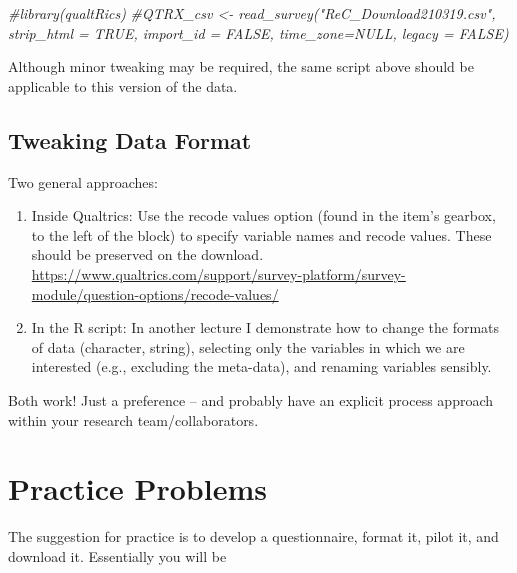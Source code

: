 \documentclass[
  english,
]{book}
\newenvironment{Shaded}{\begin{snugshade}}{\end{snugshade}}
\newcommand{\CommentTok}[1]{\textcolor[rgb]{0.56,0.35,0.01}{\textit{#1}}}
\begin{document}
\begin{Shaded}
\begin{Highlighting}[]
\CommentTok{\#library(qualtRics)}
\CommentTok{\#QTRX\_csv \textless{}{-} read\_survey("ReC\_Download210319.csv", strip\_html = TRUE, import\_id = FALSE, time\_zone=NULL, legacy = FALSE)}
\end{Highlighting}
\end{Shaded}

Although minor tweaking may be required, the same script above should be applicable to this version of the data.

\hypertarget{tweaking-data-format}{%
\subsection{Tweaking Data Format}\label{tweaking-data-format}}

Two general approaches:

\begin{enumerate}
\def\labelenumi{\arabic{enumi}.}
\item
  Inside Qualtrics: Use the recode values option (found in the item's gearbox, to the left of the block) to specify variable names and recode values. These should be preserved on the download. \url{https://www.qualtrics.com/support/survey-platform/survey-module/question-options/recode-values/}
\item
  In the R script: In another lecture I demonstrate how to change the formats of data (character, string), selecting only the variables in which we are interested (e.g., excluding the meta-data), and renaming variables sensibly.
\end{enumerate}

Both work! Just a preference -- and probably have an explicit process approach within your research team/collaborators.

\hypertarget{practice-problems-1}{%
\section{Practice Problems}\label{practice-problems-1}}

The suggestion for practice is to develop a questionnaire, format it, pilot it, and download it. Essentially you will be
\end{document}
